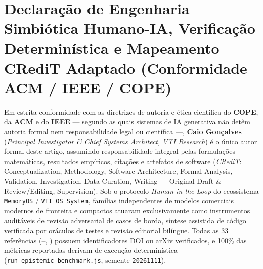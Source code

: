 \documentclass[10pt,twocolumn]{article}
\begin{document}
\section*{Declara\c{c}\~ao de Engenharia Simbi\'otica Humano-IA, Verifica\c{c}\~ao Determin\'istica e Mapeamento CRediT Adaptado (Conformidade ACM / IEEE / COPE)}

Em estrita conformidade com as diretrizes de autoria e \'etica cient\'ifica do \textbf{COPE}, da \textbf{ACM} e do \textbf{IEEE} --- segundo as quais sistemas de IA generativa n\~ao det\^em autoria formal nem responsabilidade legal ou cient\'ifica ---, \textbf{Caio Gon\c{c}alves} (\emph{Principal Investigator \& Chief Systems Architect, VTI Research}) \'e o \'unico autor formal deste artigo, assumindo responsabilidade integral pelas formula\c{c}\~oes matem\'aticas, resultados emp\'iricos, cita\c{c}\~oes e artefatos de software (\emph{CRediT}: Conceptualization, Methodology, Software Architecture, Formal Analysis, Validation, Investigation, Data Curation, Writing --- Original Draft \& Review/Editing, Supervision). Sob o protocolo \emph{Human-in-the-Loop} do ecossistema \texttt{MemoryOS} / \texttt{VTI OS System}, fam\'ilias independentes de modelos comerciais modernos de fronteira e compactos atuaram exclusivamente como instrumentos audit\'aveis de revis\~ao adversarial de casos de borda, s\'intese assistida de c\'odigo verificada por or\'aculos de testes e revis\~ao editorial bil\'ingue. Todas as 33 refer\^encias (\cite{E01}--\cite{E32}, \cite{N01}) possuem identificadores DOI ou arXiv verificados, e 100\% das m\'etricas reportadas derivam de execu\c{c}\~ao determin\'istica (\texttt{run\_epistemic\_benchmark.js}, semente \texttt{20261111}).



\end{document}

